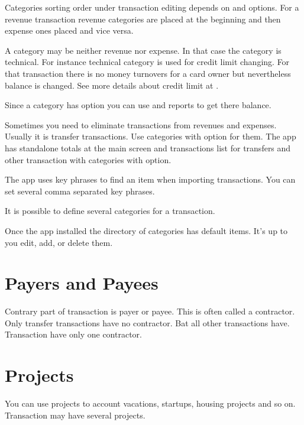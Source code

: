 \documentclass[a4paper,10pt,english]{sphinxmanual}
\begin{document}
\sphinxAtStartPar
Categories sorting order under transaction editing depends on
 and  options. For a revenue transaction
revenue categories are placed at the beginning and then expense ones placed and vice versa.

\sphinxAtStartPar
A category may be neither revenue nor expense. In that case the category is technical. For instance
technical category is used for credit limit changing. For that transaction there is no money turnovers
for a card owner but nevertheless balance is changed. See more details about credit limit at
.

\sphinxAtStartPar
Since a category has  option you can use  and 
reports to get there balance.

\sphinxAtStartPar
Sometimes you need to eliminate transactions from revenues and expenses. Usually it is
transfer transactions. Use categories with  option for them.
The app has standalone totals at the main screen and transactions list for transfers and other transaction with
categories with  option.

\sphinxAtStartPar
The app uses key phrases to find an item when importing transactions. You can set several
comma separated key phrases.

\sphinxAtStartPar
It is possible to define several categories for a transaction.

\sphinxAtStartPar
Once the app installed the directory of categories has default items. It’s up to you edit, add, or delete them.


\section{Payers and Payees}
\label{\detokenize{directories:payers-and-payees}}
\sphinxAtStartPar
Contrary part of transaction is payer or payee. This is often called a contractor. Only transfer transactions
have no contractor. Bat all other transactions have. Transaction have only one contractor.


\section{Projects}
\label{\detokenize{directories:projects}}
\sphinxAtStartPar
You can use projects to account vacations, startups, housing projects and so on.
Transaction may have several projects.
\end{document}
